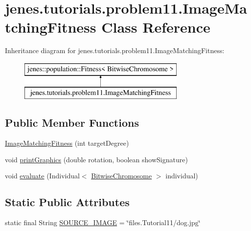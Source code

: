 \hypertarget{classjenes_1_1tutorials_1_1problem11_1_1_image_matching_fitness}{\section{jenes.\-tutorials.\-problem11.\-Image\-Matching\-Fitness Class Reference}
\label{classjenes_1_1tutorials_1_1problem11_1_1_image_matching_fitness}
}
Inheritance diagram for jenes.\-tutorials.\-problem11.\-Image\-Matching\-Fitness\-:\begin{figure}[H]
\begin{center}
\leavevmode
\includegraphics[height=2.000000cm]{classjenes_1_1tutorials_1_1problem11_1_1_image_matching_fitness}
\end{center}
\end{figure}
\subsection*{Public Member Functions}
\begin{DoxyCompactItemize}
\item 
\hyperlink{classjenes_1_1tutorials_1_1problem11_1_1_image_matching_fitness_ab2d23d7e2f9d4cbb57d5818dbcf91e05}{Image\-Matching\-Fitness} (int target\-Degree)
\item 
void \hyperlink{classjenes_1_1tutorials_1_1problem11_1_1_image_matching_fitness_a57d1723f3fea82e96455935aefb360b9}{print\-Graphics} (double rotation, boolean show\-Signature)
\item 
void \hyperlink{classjenes_1_1tutorials_1_1problem11_1_1_image_matching_fitness_ad1678b0716a862654451a29b12964ec1}{evaluate} (Individual$<$ \hyperlink{classjenes_1_1chromosome_1_1_bitwise_chromosome}{Bitwise\-Chromosome} $>$ individual)
\end{DoxyCompactItemize}
\subsection*{Static Public Attributes}
\begin{DoxyCompactItemize}
\item 
static final String \hyperlink{classjenes_1_1tutorials_1_1problem11_1_1_image_matching_fitness_abcca6e100ede27ef9a90ddbc35497efd}{S\-O\-U\-R\-C\-E\-\_\-\-I\-M\-A\-G\-E} = \char`\"{}files.\-Tutorial11/dog.\-jpg\char`\"{}
\end{DoxyCompactItemize}

